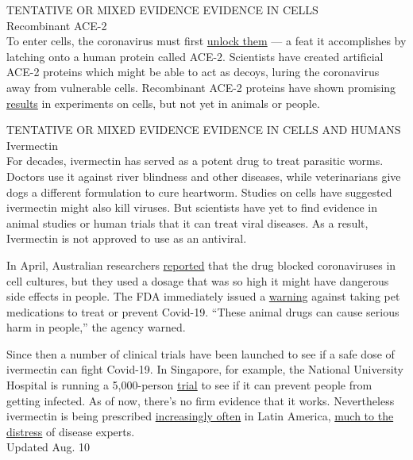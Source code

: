 TENTATIVE OR MIXED EVIDENCE EVIDENCE IN CELLS\\
Recombinant ACE-2\\
To enter cells, the coronavirus must first
\href{https://www.nytimes3xbfgragh.onion/interactive/2020/03/11/science/how-coronavirus-hijacks-your-cells.html}{unlock
them} --- a feat it accomplishes by latching onto a human protein called
ACE-2. Scientists have created artificial ACE-2 proteins which might be
able to act as decoys, luring the coronavirus away from vulnerable
cells. Recombinant ACE-2 proteins have shown promising
\href{https://doi.org/10.1016/j.cell.2020.04.004}{results} in
experiments on cells, but not yet in animals or people.

TENTATIVE OR MIXED EVIDENCE EVIDENCE IN CELLS AND HUMANS\\
Ivermectin\\
For decades, ivermectin has served as a potent drug to treat parasitic
worms. Doctors use it against river blindness and other diseases, while
veterinarians give dogs a different formulation to cure heartworm.
Studies on cells have suggested ivermectin might also kill viruses. But
scientists have yet to find evidence in animal studies or human trials
that it can treat viral diseases. As a result, Ivermectin is not
approved to use as an antiviral.

In April, Australian researchers
\href{https://www.sciencedirect.com/science/article/pii/S0166354220302011}{reported}
that the drug blocked coronaviruses in cell cultures, but they used a
dosage that was so high it might have dangerous side effects in people.
The FDA immediately issued a
\href{https://www.fda.gov/animal-veterinary/product-safety-information/fda-letter-stakeholders-do-not-use-ivermectin-intended-animals-treatment-covid-19-humans}{warning}
against taking pet medications to treat or prevent Covid-19. ``These
animal drugs can cause serious harm in people,'' the agency warned.

Since then a number of clinical trials have been launched to see if a
safe dose of ivermectin can fight Covid-19. In Singapore, for example,
the National University Hospital is running a 5,000-person
\href{https://clinicaltrials.gov/ct2/show/NCT04446104}{trial} to see if
it can prevent people from getting infected. As of now, there's no firm
evidence that it works. Nevertheless ivermectin is being prescribed
\href{https://www.nytimes3xbfgragh.onion/2020/07/23/world/americas/chlorine-coronavirus-bolivia-latin-america.html?searchResultPosition=1}{increasingly
often} in Latin America,
\href{http://www.ajtmh.org/content/journals/10.4269/ajtmh.20-0271}{much
to the distress} of disease experts.\\
Updated Aug. 10

